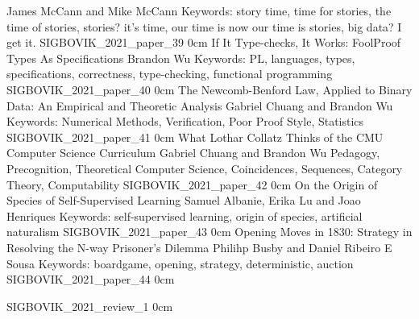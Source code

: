 	{James McCann and Mike McCann}
	{Keywords: story time, time for stories, the time of stories, stories? it's time, our time is now our time is stories, big data? I get it.}
	{SIGBOVIK_2021_paper_39}
	{0cm}
	{}
\addpaper
	{If It Type-checks, It Works: FoolProof Types As Specifications}
	{Brandon Wu}
	{Keywords: PL, languages, types, specifications, correctness, type-checking, functional programming}
	{SIGBOVIK_2021_paper_40}
	{0cm}
	{}
\addpaper
	{The Newcomb-Benford Law, Applied to Binary Data: An Empirical and Theoretic Analysis}
	{Gabriel Chuang and Brandon Wu}
	{Keywords: Numerical Methods, Verification, Poor Proof Style, Statistics}
	{SIGBOVIK_2021_paper_41}
	{0cm}
	{}
\addpaper
	{What Lothar Collatz Thinks of the CMU Computer Science Curriculum}
	{Gabriel Chuang and Brandon Wu}
	{Pedagogy, Precognition, Theoretical Computer Science, Coincidences, Sequences, Category Theory, Computability}
	{SIGBOVIK_2021_paper_42}
	{0cm}
	{}
\addpaper
	{On the Origin of Species of Self-Supervised Learning}
	{Samuel Albanie, Erika Lu and Joao Henriques}
	{Keywords: self-supervised learning, origin of species, artificial naturalism}
	{SIGBOVIK_2021_paper_43}
	{0cm}
	{}
\addpaper
	{Opening Moves in 1830: Strategy in Resolving the N-way Prisoner’s Dilemma}
	{Philihp Busby and Daniel Ribeiro E Sousa}
	{Keywords: boardgame, opening, strategy, deterministic, auction}
	{SIGBOVIK_2021_paper_44}
	{0cm}
	{}

\addreview
	{SIGBOVIK_2021_review_1}
	{0cm}
